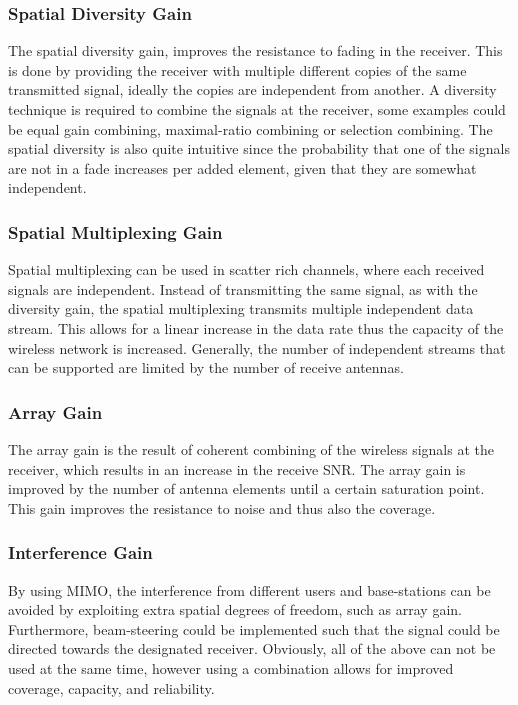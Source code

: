 \subsubsection{Spatial Diversity Gain}
The spatial diversity gain, improves the resistance to fading in the receiver. This is done by providing the receiver with multiple different copies of the same transmitted signal, ideally the copies are independent from another. A diversity technique is required to combine the signals at the receiver\cite{Ezio2007MIMO}, some examples could be equal gain combining, maximal-ratio combining or selection combining. The spatial diversity is also quite intuitive since the probability that one of the signals are not in a fade increases per added element, given that they are somewhat independent. 
 
\subsubsection{Spatial Multiplexing Gain}
Spatial multiplexing can be used in scatter rich channels, where each received signals are independent. Instead of transmitting the same signal, as with the diversity gain, the spatial multiplexing transmits multiple independent data stream. This allows for a linear increase in the data rate thus the capacity of the wireless network is increased. Generally, the number of independent streams that can be supported are limited by the number of receive antennas. \cite{Tim2012Practical}

\subsubsection{Array Gain}
The array gain is the result of coherent combining of the wireless signals at the receiver, which results in an increase in the receive SNR. The array gain is improved by the number of antenna elements until a certain saturation point. This gain improves the resistance to noise and thus also the coverage. \cite{Tim2012Practical} 
  
\subsubsection{Interference Gain}
By using MIMO, the interference from different users and base-stations can be avoided by exploiting extra spatial degrees of freedom, such as array gain. Furthermore, beam-steering could be implemented such that the signal could be directed towards the designated receiver. Obviously, all of the above can not be used at the same time, however using a combination  allows for improved coverage, capacity, and reliability. \cite{Tim2012Practical}
 

